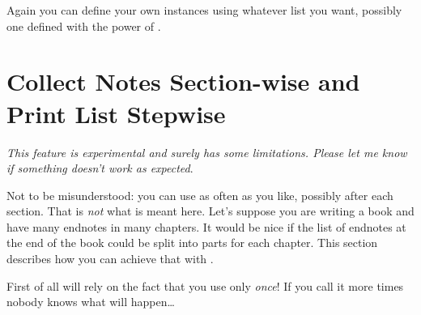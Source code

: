 \documentclass[toc=bib,toc=index]{cnpkgdoc}
\begin{document}
Again you can define your own instances using whatever list you want, possibly
one defined with the power of .

\section{Collect Notes Section-wise and Print List Stepwise}\label{sec:split}
\emph{This feature is experimental and surely has some limitations.  Please
  let me know if something doesn't work as expected}.

Not to be misunderstood: you can use  as often as you like,
possibly after each section.  That is \emph{not} what is meant here.  Let's
suppose you are writing a book and have many endnotes in many chapters.  It
would be nice if the list of endnotes at the end of the book could be split
into parts for each chapter.  This section describes how you can achieve that
with \enotez.

First of all \enotez will rely on the fact that you use 
only \emph{once}!  If you call it more times nobody knows what will
happen\ldots
\end{document}
